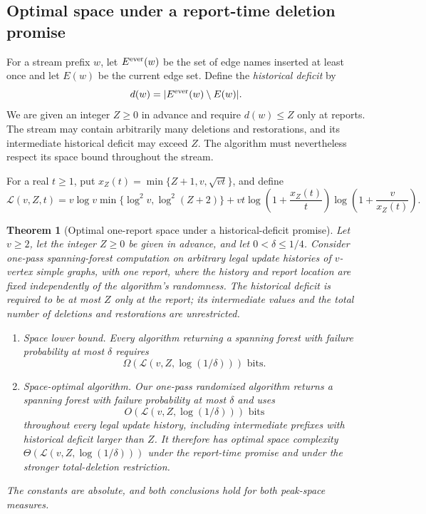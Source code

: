\documentclass[11pt,letterpaper]{article}
\newtheorem{theorem}{Theorem}[section]
\numberwithin{equation}{section}
\begin{document}
\subsection{Optimal space under a report-time deletion promise}
\label{sec:intro-historical-deficit}

For a stream prefix $w$, let $E^{\rm ever}(w)$ be the set of edge names inserted at least once and let $E(w)$ be the current edge set.
Define the \emph{historical deficit} by
\[
 d(w)=|E^{\rm ever}(w)\setminus E(w)|.
\]
We are given an integer $Z\ge0$ in advance and require $d(w)\le Z$ only at reports.
The stream may contain arbitrarily many deletions and restorations, and its intermediate historical deficit may exceed $Z$.
The algorithm must nevertheless respect its space bound throughout the stream.

For a real $t\ge1$, put $x_Z(t)=\min\{Z+1,v,\sqrt{vt}\}$, and define
\begin{equation}
\mathcal L(v,Z,t)=v\log v\min\{\log^2v,\log^2(Z+2)\}
 +vt\log\!\left(1+\frac{x_Z(t)}t\right)
      \log\!\left(1+\frac v{x_Z(t)}\right).
\label{eq:intro-space-profile}
\end{equation}

\begin{theorem}[Optimal one-report space under a historical-deficit promise]
\label{thm:historical-deficit-main}
\label{thm:deletion-budget-lower}
\label{thm:deletion-budget-space}
\label{cor:intro-historical-deficit}
Let $v\ge2$, let the integer $Z\ge0$ be given in advance, and let $0<\delta\le1/4$.
Consider one-pass spanning-forest computation on arbitrary legal update histories of $v$-vertex simple graphs, with one report, where the history and report location are fixed independently of the algorithm's randomness.
The historical deficit is required to be at most $Z$ only at the report; its intermediate values and the total number of deletions and restorations are unrestricted.
\begin{enumerate}
\item \emph{Space lower bound.} Every algorithm returning a spanning forest with failure probability at most $\delta$ requires
\[
\Omega\!\left(\mathcal L(v,Z,\log(1/\delta))\right)\text{ bits}.
\]
\item \emph{Space-optimal algorithm.} Our one-pass randomized algorithm returns a spanning forest with failure probability at most $\delta$ and uses
\begin{equation}
O\!\left(\mathcal L(v,Z,\log(1/\delta))\right)\text{ bits}
\label{eq:graph-confidence-main}
\end{equation}
throughout every legal update history, including intermediate prefixes with historical deficit larger than $Z$.
It therefore has optimal space complexity $\Theta(\mathcal L(v,Z,\log(1/\delta)))$ under the report-time promise and under the stronger total-deletion restriction.
\end{enumerate}
The constants are absolute, and both conclusions hold for both peak-space measures.
\end{theorem}
\end{document}
